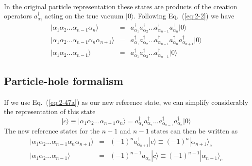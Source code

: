 \documentclass[%
twoside,                 %
final,                   %
10pt]{article}
\begin{document}
\paragraph{}
In the original particle representation these states are products of the creation operators  $a_{\alpha_i}^\dagger$ acting on the true vacuum $|0\rangle $.
Following Eq.~(\ref{eq:2-2}) we have 
\begin{eqnarray}
 |\alpha_1\alpha_2\dots\alpha_{n-1}\alpha_n\rangle &=& a_{\alpha_1}^\dagger a_{\alpha_2}^\dagger \dots
					a_{\alpha_{n-1}}^\dagger a_{\alpha_n}^\dagger |0\rangle  \label{eq:2-47a} \\
	|\alpha_1\alpha_2\dots\alpha_{n-1}\alpha_n\alpha_{n+1}\rangle &=&
		a_{\alpha_1}^\dagger a_{\alpha_2}^\dagger \dots a_{\alpha_{n-1}}^\dagger a_{\alpha_n}^\dagger
		a_{\alpha_{n+1}}^\dagger |0\rangle  \label{eq:2-47b} \\
	|\alpha_1\alpha_2\dots\alpha_{n-1}\rangle &=& a_{\alpha_1}^\dagger a_{\alpha_2}^\dagger \dots
		a_{\alpha_{n-1}}^\dagger |0\rangle  \label{eq:2-47c}
\end{eqnarray}



\subsection*{Particle-hole formalism}

\paragraph{}
If we use Eq.~(\ref{eq:2-47a}) as our new reference state, we can simplify considerably the representation of 
this state
\begin{equation}
	|c\rangle  \equiv |\alpha_1\alpha_2\dots\alpha_{n-1}\alpha_n\rangle =
		a_{\alpha_1}^\dagger a_{\alpha_2}^\dagger \dots a_{\alpha_{n-1}}^\dagger a_{\alpha_n}^\dagger |0\rangle  \label{eq:2-48a}
\end{equation}
The new reference states for the $n+1$ and $n-1$ states can then be written as
\begin{eqnarray}
	|\alpha_1\alpha_2\dots\alpha_{n-1}\alpha_n\alpha_{n+1}\rangle &=& (-1)^n a_{\alpha_{n+1}}^\dagger |c\rangle 
		\equiv (-1)^n |\alpha_{n+1}\rangle_c \label{eq:2-48b} \\
	|\alpha_1\alpha_2\dots\alpha_{n-1}\rangle &=& (-1)^{n-1} a_{\alpha_n} |c\rangle  
		\equiv (-1)^{n-1} |\alpha_{n-1}\rangle_c \label{eq:2-48c} 
\end{eqnarray}
\end{document}
